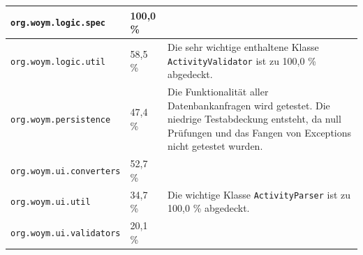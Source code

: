 \documentclass[fontsize=12pt,paper=a4,twoside]{scrartcl}
\begin{document}
\begin{tabularx}{\textwidth}{|X|p{2cm}|X|}
\hline
\texttt{org.woym.logic.spec} & 100,0 \% & \\\hline
\texttt{org.woym.logic.util} & 58,5 \% & Die sehr wichtige enthaltene Klasse \texttt{ActivityValidator} ist zu 100,0 \% abgedeckt.\\\hline
\texttt{org.woym.persistence} & 47,4 \% & Die Funktionalität aller Datenbankanfragen wird getestet. Die niedrige Testabdeckung entsteht, da null Prüfungen und das Fangen von Exceptions nicht getestet wurden. \\\hline
\texttt{org.woym.ui.converters} & 52,7 \% & \\\hline
\texttt{org.woym.ui.util} & 34,7 \% & Die wichtige Klasse \texttt{ActivityParser} ist zu 100,0 \% abgedeckt.\\\hline
\texttt{org.woym.ui.validators} & 20,1 \% & \\\hline
\end{tabularx}
\end{document}
